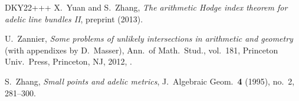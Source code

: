 \documentclass[11pt]{amsart}
\numberwithin{equation}{section}
\theoremstyle{plain}
\theoremstyle{definition}
\theoremstyle{remark}
\begin{document}
\begin{thebibliography}{DKY22+++}
X.~Yuan and S.~Zhang,
\emph{The arithmetic Hodge index theorem for adelic line bundles II},
preprint  (2013). 

U.~Zannier,
\emph{Some problems of unlikely intersections in arithmetic and geometry} (with appendixes by D.~Masser),
Ann.\ of Math.\ Stud., vol.~181,
Princeton Univ.\ Press, Princeton, NJ, 2012,
.

S.~Zhang,
\emph{Small points and adelic metrics},
J.~Algebraic Geom.\ \textbf{4} (1995), no.~2, 281--300.
\end{thebibliography}
\end{document}
